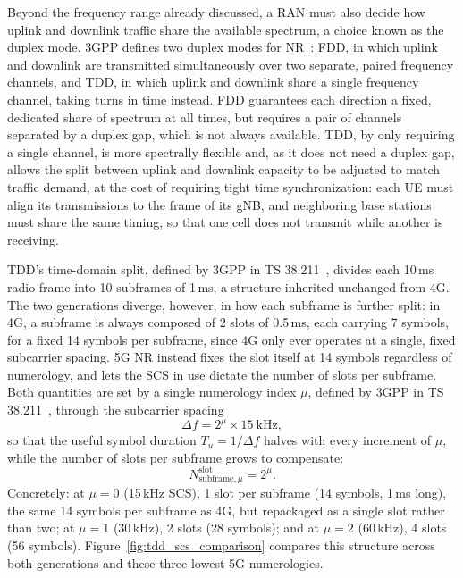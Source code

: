 Beyond the frequency range already discussed, a \gls{RAN} must also decide how uplink and downlink traffic share the available spectrum, a choice known as the duplex mode. \gls{3GPP} defines two duplex modes for \gls{NR}~\cite{3GPP38211}: \gls{FDD}, in which uplink and downlink are transmitted simultaneously over two separate, paired frequency channels, and \gls{TDD}, in which uplink and downlink share a single frequency channel, taking turns in time instead. \gls{FDD} guarantees each direction a fixed, dedicated share of spectrum at all times, but requires a pair of channels separated by a duplex gap, which is not always available. \gls{TDD}, by only requiring a single channel, is more spectrally flexible and, as it does not need a duplex gap, allows the split between uplink and downlink capacity to be adjusted to match traffic demand, at the cost of requiring tight time synchronization: each \gls{UE} must align its transmissions to the frame of its \gls{gNB}, and neighboring base stations must share the same timing, so that one cell does not transmit while another is receiving.

\gls{TDD}'s time-domain split, defined by \gls{3GPP} in TS 38.211~\cite{3GPP38211}, divides each 10\,ms radio frame into 10 subframes of 1\,ms, a structure inherited unchanged from 4G. The two generations diverge, however, in how each subframe is further split: in 4G, a subframe is always composed of 2 slots of 0.5\,ms, each carrying 7  symbols, for a fixed 14 symbols per subframe, since 4G only ever operates at a single, fixed subcarrier spacing. 5G \gls{NR} instead fixes the slot itself at 14  symbols regardless of numerology, and lets the \gls{SCS} in use dictate the number of slots per subframe. Both quantities are set by a single numerology index $\mu$, defined by \gls{3GPP} in TS 38.211~\cite[§4.2]{3GPP38211}, through the subcarrier spacing
\begin{equation}
\Delta f = 2^{\mu} \times 15\ \text{kHz},
\label{eq:scs}
\end{equation}
so that the useful symbol duration $T_u = 1/\Delta f$ halves with every increment of $\mu$, while the number of slots per subframe grows to compensate:
\begin{equation}
N^{\text{slot}}_{\text{subframe},\mu} = 2^{\mu}.
\label{eq:slots_per_subframe}
\end{equation}
Concretely: at $\mu=0$ (15\,kHz \gls{SCS}), 1 slot per subframe (14 symbols, 1\,ms long), the same 14 symbols per subframe as 4G, but repackaged as a single slot rather than two; at $\mu=1$ (30\,kHz), 2 slots (28 symbols); and at $\mu=2$ (60\,kHz), 4 slots (56 symbols). Figure~\ref{fig:tdd_scs_comparison} compares this structure across both generations and these three lowest 5G numerologies.

